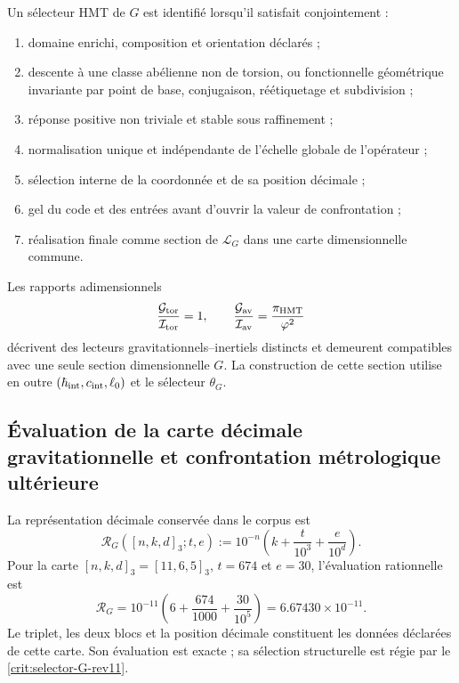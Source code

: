 \begin{criterion}
\label{crit:selector-G-rev11}
Un sélecteur HMT de \(G\) est identifié lorsqu'il satisfait conjointement :
\begin{enumerate}
 \item domaine enrichi, composition et orientation déclarés ;
 \item descente à une classe abélienne non de torsion, ou fonctionnelle géométrique
 invariante par point de base, conjugaison, réétiquetage et subdivision ;
 \item réponse positive non triviale et stable sous raffinement ;
 \item normalisation unique et indépendante de l'échelle globale de l'opérateur ;
 \item sélection interne de la coordonnée et de sa position décimale ;
 \item gel du code et des entrées avant d'ouvrir la valeur de
 confrontation ;
 \item réalisation finale comme section de \(\mathcal L_G\) dans une carte
 dimensionnelle commune.
\end{enumerate}
\end{criterion}

Les rapports adimensionnels
\[
 \frac{\mathcal G_{\rm tor}}{\mathcal I_{\rm tor}}=1,
 \qquad
 \frac{\mathcal G_{\rm av}}{\mathcal I_{\rm av}}
 =\frac{\pi_{\rm HMT}}{\varphi^2}
\]
décrivent des lecteurs gravitationnels--inertiels distincts et demeurent
compatibles avec une seule section dimensionnelle \(G\). La construction de cette
section utilise en outre
\((\hbar_{\rm int},c_{\rm int},\ell_0)\) et le sélecteur \(\theta_G\).

\subsection{Évaluation de la carte décimale gravitationnelle et confrontation métrologique ultérieure}

La représentation décimale conservée dans le corpus est
\begin{equation}
 \mathscr R_G([n,k,d]_3;t,e)
 :=10^{-n}\left(k+\frac{t}{10^3}+\frac{e}{10^d}\right).
 \label{eq:lector-decimal-G-rev11}
\end{equation}
Pour la carte
\([n,k,d]_3=[11,6,5]_3\), \(t=674\) et \(e=30\), l'évaluation rationnelle est
\begin{equation}
 \boxed{
 \mathscr R_G
 =10^{-11}\left(6+\frac{674}{1000}+\frac{30}{10^5}\right)
 =6.67430\times10^{-11}.}
 \label{eq:evaluacion-decimal-G-rev11}
\end{equation}
Le triplet, les deux blocs et la position décimale constituent les données
déclarées de cette carte. Son évaluation est exacte ; sa sélection structurelle
est régie par le \cref{crit:selector-G-rev11}.

